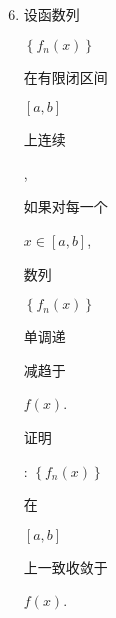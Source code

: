 \documentclass[10pt]{article}
\begin{document}
\begin{enumerate}
  \setcounter{enumi}{5}
  \item \begin{CJK}{UTF8}{mj}设函数列\end{CJK} $\left\{f_{n}(x)\right\}$ \begin{CJK}{UTF8}{mj}在有限闭区间\end{CJK} $[a, b]$ \begin{CJK}{UTF8}{mj}上连续\end{CJK}, \begin{CJK}{UTF8}{mj}如果对每一个\end{CJK} $x \in[a, b]$, \begin{CJK}{UTF8}{mj}数列\end{CJK} $\left\{f_{n}(x)\right\}$ \begin{CJK}{UTF8}{mj}单调递\end{CJK} \begin{CJK}{UTF8}{mj}减趋于\end{CJK} $f(x)$. \begin{CJK}{UTF8}{mj}证明\end{CJK}: $\left\{f_{n}(x)\right\}$ \begin{CJK}{UTF8}{mj}在\end{CJK} $[a, b]$ \begin{CJK}{UTF8}{mj}上一致收敛于\end{CJK} $f(x)$.


\end{enumerate}
\end{document}
